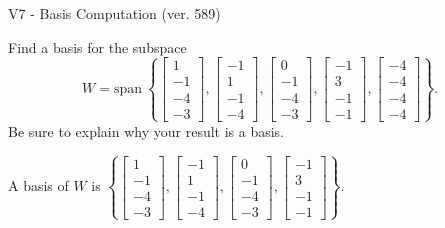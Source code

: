 \begin{exercise}
  \begin{exerciseTitle}V7 - Basis Computation (ver. 589)\end{exerciseTitle}
  \begin{exerciseStatement}
    Find a basis for the subspace 
\[W=\mathrm{span}\ \left\{\left[\begin{array}{r}
1 \\
-1 \\
-4 \\
-3
\end{array}\right] , \left[\begin{array}{r}
-1 \\
1 \\
-1 \\
-4
\end{array}\right] , \left[\begin{array}{r}
0 \\
-1 \\
-4 \\
-3
\end{array}\right] , \left[\begin{array}{r}
-1 \\
3 \\
-1 \\
-1
\end{array}\right] , \left[\begin{array}{r}
-4 \\
-4 \\
-4 \\
-4
\end{array}\right]\right\}.\]
 Be sure to explain why your result is a basis.


  \end{exerciseStatement}
  \begin{exerciseAnswer}
   A basis of \(W\) is  \(\left\{\left[\begin{array}{r}
1 \\
-1 \\
-4 \\
-3
\end{array}\right] , \left[\begin{array}{r}
-1 \\
1 \\
-1 \\
-4
\end{array}\right] , \left[\begin{array}{r}
0 \\
-1 \\
-4 \\
-3
\end{array}\right] , \left[\begin{array}{r}
-1 \\
3 \\
-1 \\
-1
\end{array}\right]\right\}\).
  


  \end{exerciseAnswer}
\end{exercise}
